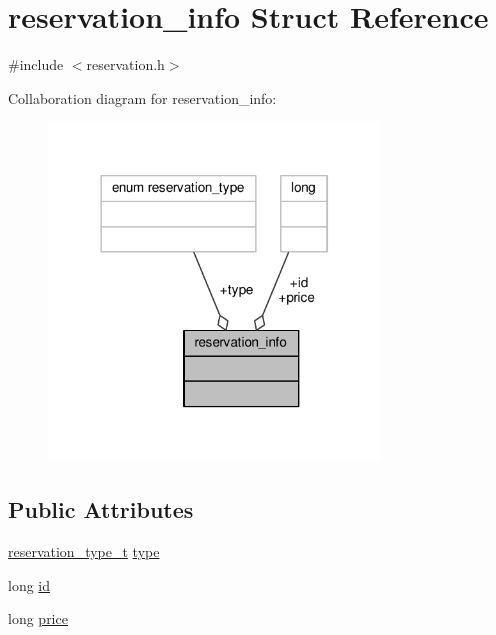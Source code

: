 \hypertarget{structreservation__info}{\section{reservation\-\_\-info Struct Reference}
\label{structreservation__info}
}


{\ttfamily \#include $<$reservation.\-h$>$}



Collaboration diagram for reservation\-\_\-info\-:
\nopagebreak
\begin{figure}[H]
\begin{center}
\leavevmode
\includegraphics[width=249pt]{structreservation__info__coll__graph}
\end{center}
\end{figure}
\subsection*{Public Attributes}
\begin{DoxyCompactItemize}
\item 
\hyperlink{reservation_8h_abf98b69fa9955803387979166fd17bc4}{reservation\-\_\-type\-\_\-t} \hyperlink{structreservation__info_ad62e8cb09833d82e77f42d3536f13aeb}{type}
\item 
long \hyperlink{structreservation__info_ad587fe253a7ae6c5ddda032796f0e494}{id}
\item 
long \hyperlink{structreservation__info_af03e586ff0e49ff03de46fa1f034ca5f}{price}
\end{DoxyCompactItemize}


